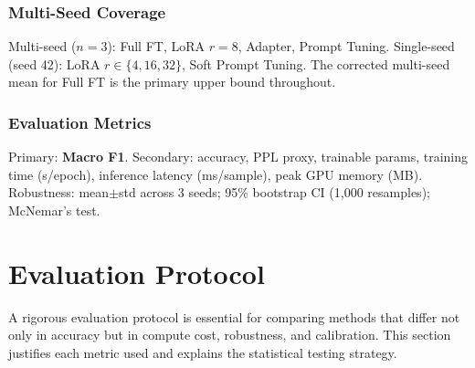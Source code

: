 \documentclass[conference]{IEEEtran}
\begin{document}
\subsubsection{Multi-Seed Coverage}
Multi-seed ($n{=}3$): Full FT\dag, LoRA $r{=}8$\dag, Adapter\dag, Prompt Tuning\dag. Single-seed (seed 42): LoRA $r{\in}\{4,16,32\}$, Soft Prompt Tuning. The corrected multi-seed mean for Full FT is the primary upper bound throughout.

\subsubsection{Evaluation Metrics}
Primary: \textbf{Macro F1}. Secondary: accuracy, PPL proxy, trainable params, training time (s/epoch), inference latency (ms/sample), peak GPU memory (MB). Robustness: mean$\pm$std across 3 seeds; 95\% bootstrap CI (1{,}000 resamples); McNemar's test.

\section{Evaluation Protocol}
\label{sec:evaluation}

A rigorous evaluation protocol is essential for comparing methods that differ not only in accuracy but in compute cost, robustness, and calibration. This section justifies each metric used and explains the statistical testing strategy.
\end{document}
